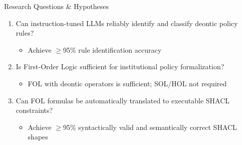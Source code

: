 \documentclass[aspectratio=169, 10pt]{beamer}
\begin{document}
\begin{frame}{Research Questions \& Hypotheses}
    \begin{enumerate}
        \item[\textbf{RQ1}] Can instruction-tuned LLMs reliably identify and classify deontic policy rules?
        \begin{itemize}
            \item[\textbf{H1}] Achieve $\geq$95\% rule identification accuracy
        \end{itemize}
        
        \vspace{0.3cm}
        \item[\textbf{RQ2}] Is First-Order Logic sufficient for institutional policy formalization?
        \begin{itemize}
            \item[\textbf{H2}] FOL with deontic operators is sufficient; SOL/HOL not required
        \end{itemize}
        
        \vspace{0.3cm}
        \item[\textbf{RQ3}] Can FOL formulas be automatically translated to executable SHACL constraints?
        \begin{itemize}
            \item[\textbf{H3}] Achieve $\geq$95\% syntactically valid and semantically correct SHACL shapes
        \end{itemize}
    \end{enumerate}
\end{frame}
\end{document}
